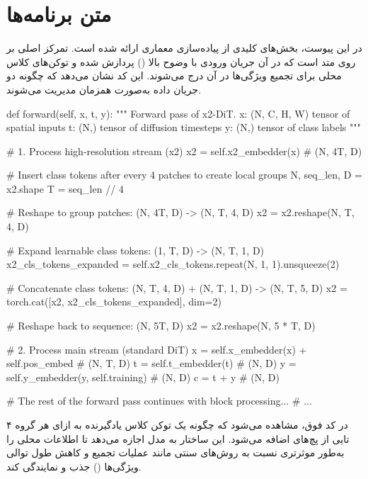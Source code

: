 \chapter{‌متن برنامه‌ها}
\thispagestyle{empty}
در این پیوست، بخش‌های کلیدی از پیاده‌سازی معماری  ارائه شده است. تمرکز اصلی بر روی متد  است که در آن جریان ورودی با وضوح بالا () پردازش شده و توکن‌های کلاس محلی برای تجمیع ویژگی‌ها در آن درج می‌شوند. این کد نشان می‌دهد که چگونه دو جریان داده به‌صورت همزمان مدیریت می‌شوند.


\begin{latin}
\begin{python}
def forward(self, x, t, y):
    """
    Forward pass of x2-DiT.
    x: (N, C, H, W) tensor of spatial inputs
    t: (N,) tensor of diffusion timesteps
    y: (N,) tensor of class labels
    """

    # 1. Process high-resolution stream (x2)
    x2 = self.x2_embedder(x)  # (N, 4T, D)

    # Insert class tokens after every 4 patches to create local groups
    N, seq_len, D = x2.shape
    T = seq_len // 4

    # Reshape to group patches: (N, 4T, D) -> (N, T, 4, D)
    x2 = x2.reshape(N, T, 4, D)

    # Expand learnable class tokens: (1, T, D) -> (N, T, 1, D)
    x2_cls_tokens_expanded = self.x2_cls_tokens.repeat(N, 1, 1).unsqueeze(2)

    # Concatenate class tokens: (N, T, 4, D) + (N, T, 1, D) -> (N, T, 5, D)
    x2 = torch.cat([x2, x2_cls_tokens_expanded], dim=2)

    # Reshape back to sequence: (N, 5T, D)
    x2 = x2.reshape(N, 5 * T, D)

    # 2. Process main stream (standard DiT)
    x = self.x_embedder(x) + self.pos_embed  # (N, T, D)
    t = self.t_embedder(t)                   # (N, D)
    y = self.y_embedder(y, self.training)    # (N, D)
    c = t + y                                # (N, D)

    # The rest of the forward pass continues with block processing...
    # ...
\end{python}
\end{latin}

در کد فوق، مشاهده می‌شود که چگونه یک توکن کلاس یادگیرنده به ازای هر گروه ۴ تایی از پچ‌های  اضافه می‌شود. این ساختار به مدل اجازه می‌دهد تا اطلاعات محلی را به‌طور موثرتری نسبت به روش‌های سنتی مانند عملیات تجمیع و کاهش طول توالی ویژگی‌ها () جذب و نمایندگی کند.
